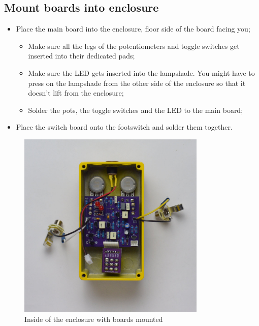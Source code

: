 \documentclass[a4paper,12pt]{article}
\begin{document}
\pagebreak

\subsection{Mount boards into enclosure}

\begin{itemize}
  \item Place the main board into the enclosure, floor side
    of the board facing you;
    \begin{itemize}
      \item Make sure all the legs of the potentiometers and toggle
        switches get inserted into their dedicated pads;
      \item Make sure the LED gets inserted into the
        lampshade. You might have to press on the lampshade
        from the other side of the enclosure so that it
        doesn't lift from the enclosure;
      \item Solder the pots, the toggle switches and the LED to
        the main board;
    \end{itemize}
  \item Place the switch board onto the footswitch and
    solder them together.
\end{itemize}


\begin{figure}[h!]
  \begin{center}
    \includegraphics[width=0.8\textwidth]{build/19-board-enclosure-1000px.jpg}
  \end{center}
  \caption{Inside of the enclosure with boards mounted}
\end{figure}
\end{document}
